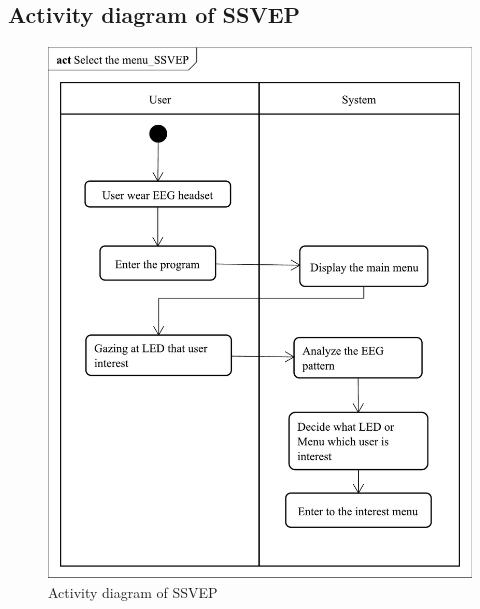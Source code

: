 \subsection{Activity diagram of SSVEP}
\begin{figure}[ht]
	\centering
	\includegraphics[scale = 0.295]{chapter4/av_SSVEP.pdf}
	\caption{Activity diagram of SSVEP}
\end{figure}